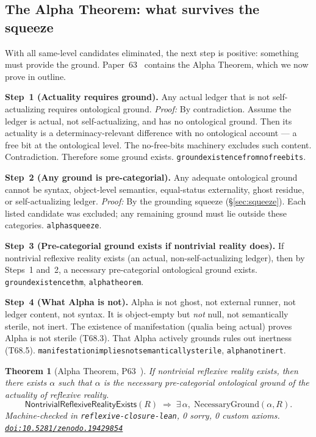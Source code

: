 \documentclass[11pt]{article}
\newtheorem{theorem}{Theorem}[section]
\theoremstyle{remark}
\newcommand{\lean}[1]{%
  \penalty-100
  \begingroup\def\_{\textunderscore\allowbreak}\texttt{#1}\endgroup}
\newcommand{\doi}[1]{\href{https://doi.org/#1}{\nolinkurl{doi:#1}}}
\newcommand{\NontrivialReflexiveRealityExists}{\mathsf{NontrivialReflexiveRealityExists}}
\begin{document}
\subsection{The Alpha Theorem: what survives the squeeze}\label{sec:alpha}

With all same-level candidates eliminated, the next step is positive: something must
provide the ground. Paper~63~\cite{SpivackNEMS63} contains the Alpha Theorem, which
we now prove in outline.

\begin{tcolorbox}[colback=orange!5,colframe=orange!60!black,
  title={The Grounding Argument in Four Steps}]

\textbf{Step~1 (Actuality requires ground).}
Any actual ledger that is not self-actualizing requires ontological ground.
\emph{Proof:} By contradiction. Assume the ledger is actual, not self-actualizing, and
has no ontological ground. Then its actuality is a determinacy-relevant difference with
no ontological account --- a free bit at the ontological level. The no-free-bits
machinery excludes such content. Contradiction. Therefore some ground exists.
\lean{ground\_existence\_from\_no\_free\_bits}.

\medskip
\textbf{Step~2 (Any ground is pre-categorial).}
Any adequate ontological ground cannot be syntax, object-level semantics, equal-status
externality, ghost residue, or self-actualizing ledger.
\emph{Proof:} By the grounding squeeze (\S\ref{sec:squeeze}). Each listed candidate
was excluded; any remaining ground must lie outside these categories.
\lean{alpha\_squeeze}.

\medskip
\textbf{Step~3 (Pre-categorial ground exists if nontrivial reality does).}
If nontrivial reflexive reality exists (an actual, non-self-actualizing ledger),
then by Steps~1 and~2, a necessary pre-categorial ontological ground exists.
\lean{ground\_existence\_thm}, \lean{alpha\_theorem}.

\medskip
\textbf{Step~4 (What Alpha is not).}
Alpha is not ghost, not external runner, not ledger content, not syntax.
It is object-empty but \emph{not} null, not semantically sterile, not inert.
The existence of manifestation (qualia being actual) proves Alpha is not sterile
(T68.3). That Alpha actively grounds rules out inertness (T68.5).
\lean{manifestation\_implies\allowbreak\_not\_semantically\_sterile}, \lean{alpha\_not\_inert}.
\end{tcolorbox}

\begin{theorem}[Alpha Theorem, P63~\cite{SpivackNEMS63}]
If nontrivial reflexive reality exists, then there exists $\alpha$ such that $\alpha$
is the necessary pre-categorial ontological ground of the actuality of reflexive reality.
\[
  \NontrivialReflexiveRealityExists(R) \;\Rightarrow\;
  \exists\,\alpha,\; \mathrm{NecessaryGround}(\alpha, R).
\]
Machine-checked in \lean{reflexive-closure-lean}, 0 sorry, 0 custom axioms.
\doi{10.5281/zenodo.19429854}
\end{theorem}
\end{document}
